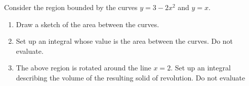 \documentclass[12pt]{article}
\begin{document}
Consider the region bounded by the curves $y=3-2x^2$ and $y=x$.
\begin{enumerate}
\item Draw a sketch of the area between the curves.
\vspace{2in}
\item Set up an integral whose value is the area between the curves.  Do not evaluate.
\vspace{2in}
\item 
The above region is rotated around the line $x=2$.
Set up an integral describing the volume of the resulting solid of revolution.
Do not evaluate
\end{enumerate}
\end{document}
